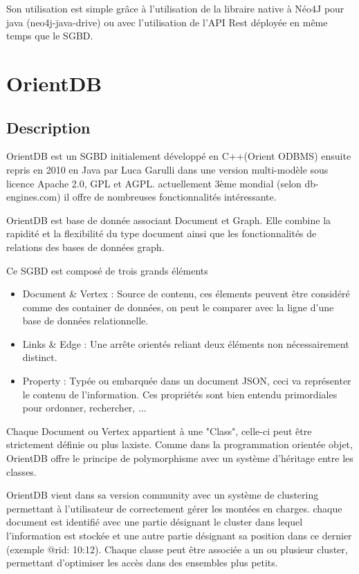 \documentclass[a4paper,fleqn,12pt]{report}
\begin{document}
Son utilisation est simple grâce à l'utilisation de la libraire native à Néo4J pour java (neo4j-java-drive) ou avec l'utilisation de l'API Rest déployée en même temps que le SGBD.

\section{OrientDB}

\subsection{Description}

OrientDB est un SGBD initialement développé en C++(Orient ODBMS) ensuite repris en 2010 en Java par Luca Garulli dans une version multi-modèle sous licence Apache 2.0, GPL et AGPL. actuellement 3ème mondial (selon db-engines.com) il offre de nombreuses fonctionnalités intéressante. 

OrientDB est base de donnée associant Document et Graph. Elle combine la rapidité et la flexibilité du type document ainsi que les fonctionnalités de relations des bases de données graph. 

Ce SGBD est composé de trois grands éléments 

\begin{itemize}
\item Document \& Vertex : Source de contenu, ces élements peuvent être considéré comme des container de données, on peut le comparer avec la ligne d'une base de données relationnelle.
\item Links \& Edge : Une arrête orientés reliant deux éléments non nécessairement distinct.
\item Property : Typée ou embarquée dans un document JSON, ceci va représenter le contenu de l'information. Ces propriétés sont bien entendu primordiales pour ordonner, rechercher, ...
\end{itemize}

Chaque Document ou Vertex appartient à une "Class", celle-ci peut être strictement définie ou plus laxiste. Comme dans la programmation orientée objet, OrientDB offre le principe de polymorphisme avec un système d'héritage entre les classes. 

OrientDB vient dans sa version community avec un système de clustering permettant à l'utilisateur de correctement gérer les montées en charges. chaque document est identifié avec une partie désignant le cluster dans lequel l'information est stockée et une autre partie désignant sa position dans ce dernier (exemple @rid: 10:12). Chaque classe peut être associée a un ou plusieur cluster, permettant d'optimiser les accès dans des ensembles  plus petits.
\end{document}
